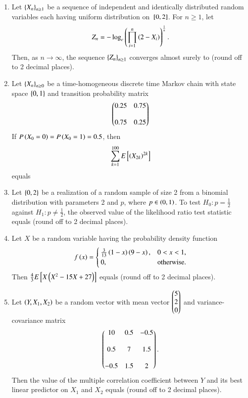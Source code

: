 \documentclass[journal]{IEEEtran}
\begin{document}
\begin{enumerate}
\item Let $\left\{X_n\right\}_{n\geq1}$ be a sequence of independent and identically distributed random variables each having uniform distribution on ${}\left[0,2\right]$. For $n \geq 1$, let
\begin{align*}
Z_n = - \log_e \left( \prod_{i=1}^{n} \left(2 - X_i\right) \right)^{\frac{1}{n}}.
\end{align*}
Then, as $n \to \infty$, the sequence $\left\{Z_n\right\}_{n\geq1}$ converges almost surely to \underline{\hspace{1cm}} (round off to 2 decimal places).

\item Let $\left\{X_n\right\}_{n \geq 0}$ be a time-homogeneous discrete time Markov chain with state space $\left\{0,1\right\}$ and transition probability matrix
\begin{align*}
\begin{pmatrix} 0.25 & 0.75 \\ \\
	0.75 & 0.25\end{pmatrix}
\end{align*}
If $P\left(X_0 = 0\right) = P\left(X_0 = 1\right) = 0.5$, then
\begin{align*}
\sum_{k=1}^{100} E {}\left[\left(X_{2k}\right)^{2k}\right]
\end{align*}
equals \underline{\hspace{1cm}}

\item Let $\left\{0,2\right\}$ be a realization of a random sample of size 2 from a binomial distribution with parameters 2 and $p$, where $p \in \left(0,1\right)$. To test $H_0: p = \frac{1}{2}$ against $H_1: p \neq \frac{1}{2}$, the observed value of the likelihood ratio test statistic equals \underline{\hspace{1cm}} (round off to 2 decimal places).

\item Let $X$ be a random variable having the probability density function
\begin{align*}
f\left(x\right) = 
\begin{cases}
\frac{3}{13} \left(1 - x\right) \left(9 - x\right), & 0 < x < 1, \\
0, & \text{otherwise}.
\end{cases}
\end{align*}
Then $\frac{4}{3} E {}\left[X \left(X^2 - 15X + 27\right)\right]$ equals \underline{\hspace{1cm}} (round off to 2 decimal places).

\item Let $\left(Y, X_1, X_2\right)$ be a random vector with mean vector 
	$\begin{pmatrix} 5 \\ 2 \\ 0 \end{pmatrix}$
	 and variance-covariance matrix
\begin{align*}
	\begin{pmatrix} 10 & 0.5 & -0.5 \\ \\ 
	0.5 & 7 & 1.5 \\ \\ 
	-0.5 & 1.5 & 2\end{pmatrix}.
\end{align*}
Then the value of the multiple correlation coefficient between $Y$ and its best linear predictor on $X_1$ and $X_2$ equals \underline{\hspace{1cm}} (round off to 2 decimal places).


\end{enumerate}
\end{document}
